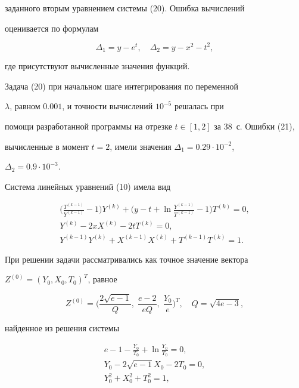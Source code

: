 заданного вторым уравнением системы (20). Ошибка вычислений


оценивается по формулам


\begin{equation}


\Delta_1=y-e^t,\quad \Delta_2=y-x^2-t^2,


\end{equation}


где присутствуют вычисленные значения функций.





Задача (20) при начальном шаге интегрирования по переменной


$\lambda$, равном $0.001$, и точности вычислений $10^{-5}$ решалась при


помощи разработанной программы на отрезке $t\in[1,2]$ за 38~с. Ошибки (21),


вычисленные в момент $t=2$, имели значения $\Delta_1=0.29\cdot 10^{-2}$,


$\Delta_2=0.9\cdot 10^{-3}$.





Система линейных уравнений (10) имела вид


\begin{gather*}


\bigg(\frac{T^{(k-1)}}{Y^{(k-1)}}-1\bigg)Y^{(k)}+\bigg(y-t+


\ln\frac{Y^{(k-1)}}{T^{(k-1)}}-1\bigg)T^{(k)}=0,\\


Y^{(k)}-2xX^{(k)}-2tT^{(k)}=0,\\


Y^{(k-1)}Y^{(k)}+X^{(k-1)}X^{(k)}+T^{(k-1)}T^{(k)}=1.


\end{gather*}





При решении задачи рассматривались как точное значение вектора


$Z^{(0)}=(Y_0,X_0,T_0)^T$, равное


$$


Z^{(0)}=\bigg(\frac{2\sqrt{e-1}}{Q},\; \frac{e-2}{eQ},


\; \frac{Y_0}{e}\bigg)^T,\quad Q=\sqrt{4e-3},


$$


найденное из решения системы


\begin{gather*}


e-1-\frac{Y_0}{T_0}+\ln\frac{Y_0}{T_0}=0,\\


Y_0-2\sqrt{e-1}X_0-2T_0=0,\\


Y_0^2+X_0^2+T_0^2=1,


\end{gather*}


